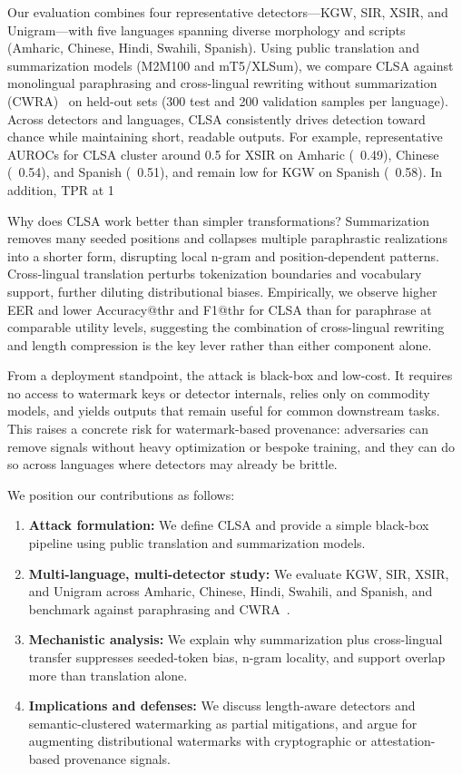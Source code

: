 \documentclass{article}
\begin{document}
Our evaluation combines four representative detectors—KGW, SIR, XSIR, and Unigram—with five languages spanning diverse morphology and scripts (Amharic, Chinese, Hindi, Swahili, Spanish). Using public translation and summarization models (M2M100 and mT5/XLSum), we compare CLSA against monolingual paraphrasing and cross-lingual rewriting without summarization (CWRA)~\citep{He2024cwra} on held-out sets (300 test and 200 validation samples per language). Across detectors and languages, CLSA consistently drives detection toward chance while maintaining short, readable outputs. For example, representative AUROCs for CLSA cluster around 0.5 for XSIR on Amharic (~0.49), Chinese (~0.54), and Spanish (~0.51), and remain low for KGW on Spanish (~0.58). In addition, TPR at 1%

Why does CLSA work better than simpler transformations? Summarization removes many seeded positions and collapses multiple paraphrastic realizations into a shorter form, disrupting local n-gram and position-dependent patterns. Cross-lingual translation perturbs tokenization boundaries and vocabulary support, further diluting distributional biases. Empirically, we observe higher EER and lower Accuracy@thr and F1@thr for CLSA than for paraphrase at comparable utility levels, suggesting the combination of cross-lingual rewriting and length compression is the key lever rather than either component alone.

From a deployment standpoint, the attack is black-box and low-cost. It requires no access to watermark keys or detector internals, relies only on commodity models, and yields outputs that remain useful for common downstream tasks. This raises a concrete risk for watermark-based provenance: adversaries can remove signals without heavy optimization or bespoke training, and they can do so across languages where detectors may already be brittle.

We position our contributions as follows:
\begin{enumerate}
    \item \textbf{Attack formulation:} We define CLSA and provide a simple black-box pipeline using public translation and summarization models.
    \item \textbf{Multi-language, multi-detector study:} We evaluate KGW, SIR, XSIR, and Unigram across Amharic, Chinese, Hindi, Swahili, and Spanish, and benchmark against paraphrasing and CWRA~\citep{He2024cwra}.
    \item \textbf{Mechanistic analysis:} We explain why summarization plus cross-lingual transfer suppresses seeded-token bias, n-gram locality, and support overlap more than translation alone.
    \item \textbf{Implications and defenses:} We discuss length-aware detectors and semantic-clustered watermarking as partial mitigations, and argue for augmenting distributional watermarks with cryptographic or attestation-based provenance signals.
\end{enumerate}
\end{document}
